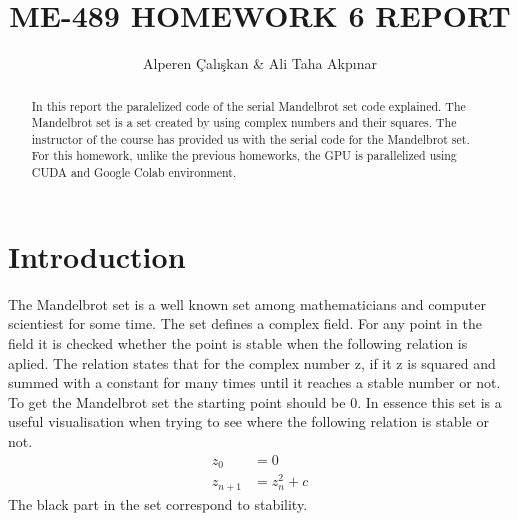 \documentclass{article}
\title{ME-489 HOMEWORK 6 REPORT}
\author{Alperen Çalışkan & Ali Taha Akpınar}
\begin{document}
\maketitle
\begin{abstract}
In this report the paralelized code of the serial Mandelbrot set code explained. The Mandelbrot set is a set created by using complex numbers and their squares. The instructor of the course has provided us with the serial code for the Mandelbrot set. For this homework, unlike the previous homeworks, the GPU is parallelized using CUDA and Google Colab environment.
\end{abstract}

\section{Introduction}
The Mandelbrot set is a well known set among mathematicians and computer scientiest for some time. The set defines a complex field. For any point in the field it is checked whether the point is stable when the following relation is aplied. The relation states that for the complex number z, if it z is squared and summed with a constant for many times until it reaches a stable number or not. To get the Mandelbrot set the starting point should be 0. In essence this set is a useful visualisation when trying to see where the following relation is stable or not.
\begin{align*}
z_0 &= 0 \\
z_{n+1} &= z_n^2 + c
\end{align*}
The black part in the set correspond to stability. 
\end{document}
